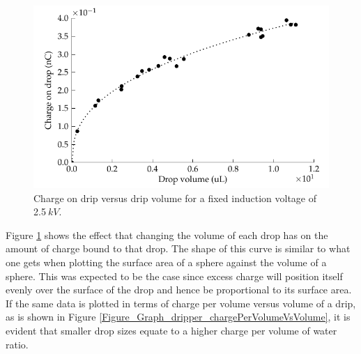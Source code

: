 \begin{figure}[H]
\begin{centering}
\includegraphics{content/appendices/chargedWaterDrops/graphics/dripper_chargeVsVolume}
\par\end{centering}

\protect\caption{\label{Graph_dripperExperiment_chargeVsVolume}Charge on drip versus
drip volume for a fixed induction voltage of 2.5$\: kV$.}
\end{figure}
Figure \ref{Graph_dripperExperiment_chargeVsVolume} shows the effect
that changing the volume of each drop has on the amount of charge
bound to that drop. The shape of this curve is similar to what one
gets when plotting the surface area of a sphere against the volume
of a sphere. This was expected to be the case since excess charge
will position itself evenly over the surface of the drop and hence
be proportional to its surface area. If the same data is plotted in
terms of charge per volume versus volume of a drip, as is shown in
Figure \ref{Figure_Graph_dripper_chargePerVolumeVsVolume}, it is
evident that smaller drop sizes equate to a higher charge per volume
of water ratio.

